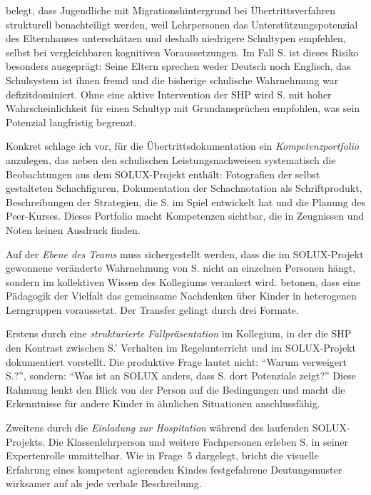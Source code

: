 \documentclass[ngerman, a4paper]{article}
\begin{document}
\textcite[S.\,90--104]{leikhof2021jugendliche} belegt, dass Jugendliche mit Migrationshintergrund bei
Übertrittsverfahren strukturell benachteiligt werden, weil Lehrpersonen
das Unterstützungspotenzial des Elternhauses unterschätzen und deshalb
niedrigere Schultypen empfehlen, selbst bei vergleichbaren kognitiven
Voraussetzungen. Im Fall S. ist dieses
Risiko besonders ausgeprägt: Seine Eltern sprechen weder Deutsch noch Englisch,
das Schulsystem ist ihnen fremd und die bisherige schulische Wahrnehmung
war defizitdominiert. Ohne eine aktive Intervention der SHP wird S. mit hoher
Wahrscheinlichkeit für einen Schultyp mit Grundansprüchen empfohlen, was
sein Potenzial langfristig begrenzt.

Konkret schlage ich vor, für die Übertrittsdokumentation ein
\textit{Kompetenzportfolio} anzulegen, das neben den schulischen
Leistungsnachweisen systematisch die Beobachtungen aus dem SOLUX-Projekt
enthält: Fotografien der selbst gestalteten Schachfiguren, Dokumentation
der Schachnotation als Schriftprodukt, Beschreibungen der Strategien, die
S. im Spiel entwickelt hat und die Planung des Peer-Kurses. Dieses Portfolio
macht Kompetenzen sichtbar, die in Zeugnissen und Noten keinen Ausdruck finden.

Auf der \textit{Ebene des Teams} muss sichergestellt werden, dass die im
SOLUX-Projekt gewonnene veränderte Wahrnehmung von S. nicht an einzelnen
Personen hängt, sondern im kollektiven Wissen des Kollegiums verankert wird.
\textcite[S.\,9--10]{buholzerkummerwyss2010heterogenitaet} betonen,
dass eine Pädagogik der Vielfalt das gemeinsame Nachdenken über Kinder
in heterogenen Lerngruppen voraussetzt. Der Transfer gelingt durch
drei Formate.

Erstens durch eine \textit{strukturierte Fallpräsentation} im Kollegium, in
der die SHP den Kontrast zwischen S.' Verhalten im Regelunterricht und im
SOLUX-Projekt dokumentiert vorstellt. Die produktive Frage lautet nicht:
\enquote{Warum verweigert S.?}, sondern: \enquote{Was ist an SOLUX anders, dass
  S. dort Potenziale zeigt?} Diese Rahmung lenkt den Blick von der Person auf
die Bedingungen und macht die Erkenntnisse für andere Kinder in ähnlichen
Situationen anschlussfähig.

Zweitens durch die \textit{Einladung zur Hospitation} während des laufenden
SOLUX-Projekts. Die Klassenlehrperson und weitere Fachpersonen erleben S. in
seiner Expertenrolle unmittelbar. Wie in Frage~5 dargelegt, bricht die
visuelle Erfahrung eines kompetent agierenden Kindes festgefahrene
Deutungsmuster wirksamer auf als jede verbale Beschreibung.
\end{document}
